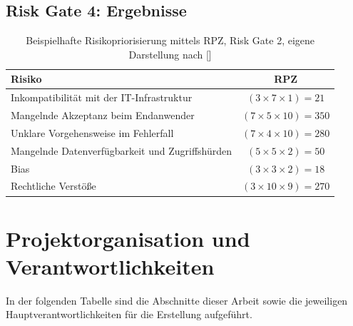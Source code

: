 \subsection{Risk Gate 4: Ergebnisse}

\begin{table}[H]
\centering
\begin{tabular}{|p{9cm}|c|}
\hline
\textbf{Risiko} & \textbf{RPZ} \\ \hline
Inkompatibilität mit der IT-Infrastruktur & $(3 \times 7 \times 1) = 21$ \\ \hline
Mangelnde Akzeptanz beim Endanwender & $(7 \times 5 \times 10) = 350$ \\ \hline
Unklare Vorgehensweise im Fehlerfall & $(7 \times 4 \times 10) = 280$ \\ \hline
Mangelnde Datenverfügbarkeit und Zugriffshürden & $(5 \times 5 \times 2) = 50$ \\ \hline
Bias & $(3 \times 3 \times 2) = 18$ \\ \hline
Rechtliche Verstöße & $(3 \times 10 \times 9) = 270$ \\ \hline
\end{tabular}
\caption{Beispielhafte Risikopriorisierung mittels RPZ, Risk Gate 2, eigene Darstellung nach []}
\label{tab:rpz_risiken}
\end{table}

\section{Projektorganisation und Verantwortlichkeiten}

In der folgenden Tabelle sind die Abschnitte dieser Arbeit sowie die jeweiligen Hauptverantwortlichkeiten für die Erstellung aufgeführt.

